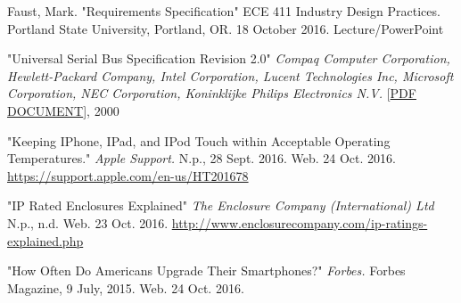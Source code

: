 

{} %

\begin{thebibliography}{}

Faust, Mark. "Requirements Specification" ECE 411 Industry Design Practices. Portland State University, Portland, OR. 18 October 2016. Lecture/PowerPoint


"Universal Serial Bus Specification Revision 2.0"
\emph{Compaq Computer Corporation,
Hewlett-Packard Company, Intel Corporation, Lucent Technologies Inc,
Microsoft Corporation, NEC Corporation, Koninklijke Philips Electronics N.V.} \small{[\href{http://www.pjrc.com/teensy/beta/usb20.pdf\#page=206}{PDF DOCUMENT}]}, \normalsize 2000
 
"Keeping IPhone, IPad, and IPod Touch within Acceptable Operating Temperatures."
\emph{Apple Support.} N.p., 28 Sept. 2016. Web. 24 Oct. 2016. \url{https://support.apple.com/en-us/HT201678}

"IP Rated Enclosures Explained"
\emph{The Enclosure Company (International) Ltd} N.p., n.d. Web. 23 Oct. 2016. \url{http://www.enclosurecompany.com/ip-ratings-explained.php}

"How Often Do Americans Upgrade Their Smartphones?" \emph{Forbes.} Forbes Magazine, 9 July, 2015. Web. 24 Oct. 2016.



\end{thebibliography}







    

    


    

    
    

    
    



    

    

    

    
    